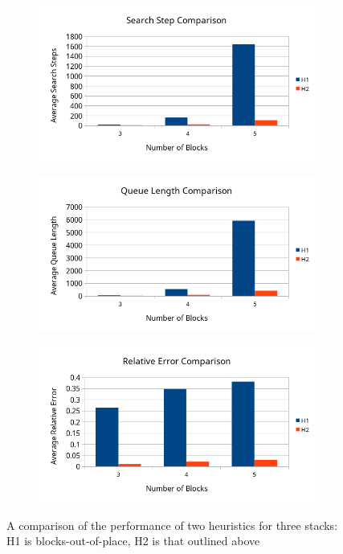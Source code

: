 \documentclass{article}
\begin{document}
\begin{figure}
    \centering
    \begin{subfigure}{\linewidth}
	\centering
	\includegraphics[width=.65\linewidth]{H1vsH2_AvgSteps.png}\hfill
	\caption{}
    \end{subfigure}\par\medskip
    \begin{subfigure}{\linewidth}
	\centering
	\includegraphics[width=.65\linewidth]{H1vsH2_AvgQL.png}\hfill
	\caption{}
    \end{subfigure}\par\medskip
    \begin{subfigure}{\linewidth}
	\centering
	\includegraphics[width=.65\linewidth]{H1vsH2_AvgRelErr.png}\hfill
	\caption{}
    \end{subfigure}
    \caption{A comparison of the performance of two heuristics for three
    stacks: H1 is blocks-out-of-place, H2 is that outlined above }
    \label{fig:comparison}
\end{figure}
\end{document}

